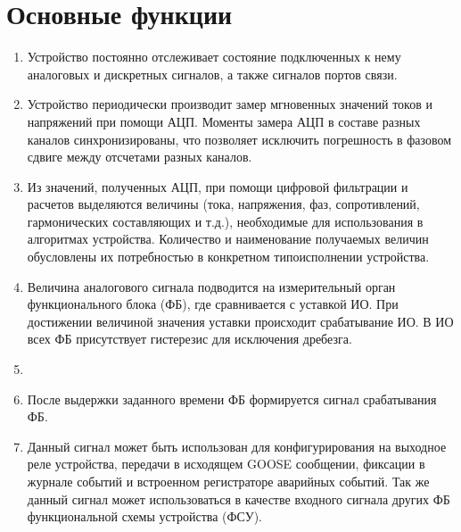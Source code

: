 \color{unidarkgreen}\section[Основные функции]{Основные функции}\label{sec:funcs}
\color{black}

\color{black}

\begin{enumerate}
    
\item
Устройство постоянно отслеживает состояние подключенных к нему аналоговых и дискретных сигналов, а также сигналов портов связи.

\item
Устройство периодически производит замер мгновенных значений токов и напряжений при помощи АЦП. Моменты замера АЦП в составе разных каналов синхронизированы, что позволяет исключить погрешность в фазовом сдвиге между отсчетами разных каналов.

\item
Из значений, полученных АЦП, при помощи цифровой фильтрации и расчетов выделяются величины (тока, напряжения, фаз, сопротивлений, гармонических составляющих и т.д.), необходимые для использования в алгоритмах устройства. Количество и наименование получаемых величин обусловлены их потребностью в конкретном типоисполнении устройства.

\item
Величина аналогового сигнала подводится на измерительный орган функционального блока (ФБ), где сравнивается с уставкой ИО. При достижении величиной значения уставки происходит срабатывание ИО. В ИО всех ФБ присутствует гистерезис для исключения дребезга.

\item
{}

\item
После выдержки заданного времени ФБ формируется сигнал срабатывания ФБ.

\item
Данный сигнал может быть использован для конфигурирования на выходное реле устройства, передачи в исходящем GOOSE сообщении, фиксации в журнале событий и встроенном регистраторе аварийных событий. Так же данный сигнал может использоваться в качестве входного сигнала других ФБ функциональной схемы устройства (ФСУ).


\end{enumerate}
